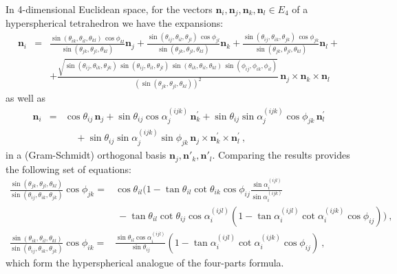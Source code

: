 \documentclass[fleqn,11pt,twoside]{article}
\theoremstyle{definition}
\begin{document}
In 4-dimensional Euclidean space, for the vectors  $\mathbf{n}_i,\mathbf{n}_j,\mathbf{n}_k,\mathbf{n}_l\in E_4$ of a hyperspherical tetrahedron we have the 
expansions: 
\begin{eqnarray} 
\mathbf{n}_i&=&
\frac{\sin(\theta_{ik},\theta_{il},\theta_{kl})\,\cos\phi_{kl}}
{\sin(\theta_{jk},\theta_{jl},\theta_{kl})}\mathbf{n}_j + 
\frac{\sin(\theta_{ij},\theta_{il},\theta_{jl})\,\cos\phi_{jl}}
{\sin(\theta_{jk},\theta_{jl},\theta_{kl})}\mathbf{n}_k + 
\frac{\sin(\theta_{ij},\theta_{ik},\theta_{jk})\,\cos\phi_{jk}}
{\sin(\theta_{jk},\theta_{jl},\theta_{kl})}\mathbf{n}_l +   \\ 
&& + \frac{\sqrt{
\sin(\theta_{ij},\theta_{ik},\theta_{jk})\,\sin(\theta_{ij},\theta_{il},\theta_{jl})\, 
\sin(\theta_{ik},\theta_{il},\theta_{kl})\,\sin(\phi_{ij},\phi_{ik},\phi_{il})}}
{\left(\sin(\theta_{jk},\theta_{jl},\theta_{kl})\right)^2}
\,\mathbf{n}_j\times\mathbf{n}_k\times\mathbf{n}_l\   
\end{eqnarray} 
as well as 
\begin{eqnarray}
\mathbf{n}_i&=&\cos\theta_{ij}\,\mathbf{n}_j + \sin\theta_{ij}\cos\alpha^{(ijk)}_j\, 
\mathbf{n}^\prime_k + \sin\theta_{ij}\sin\alpha^{(ijk)}_j\cos\phi_{jk}\,
\mathbf{n}_l^\prime   \\ 
&& ~~~~~ + \sin\theta_{ij}\sin\alpha^{(ijk)}_j\sin\phi_{jk}\,\mathbf{n}_j
\times\mathbf{n}^\prime_k\times\mathbf{n}^\prime_l\   , 
\end{eqnarray}  
in a (Gram-Schmidt) orthogonal basis $\mathbf{n}_j,\mathbf{n}'_k,\mathbf{n}'_l$. Comparing the results provides the following set of equations: 
\begin{equation} 
\begin{split}
\frac{\sin(\theta_{jk},\theta_{jl},\theta_{kl})}
{\sin(\theta_{ij},\theta_{ik},\theta_{jk})} \cos\phi_{jk} = 
&\cos\theta_{il} \Bigg( 1 - \tan\theta_{il}\cot\theta_{ik}\cos\phi_{ij} 
\frac{\sin\alpha_i^{(ijl)}}{\sin\alpha_i^{(ijk)}}   \\ 
&\ - \tan\theta_{il}\cot\theta_{ij}\cos\alpha_i^{(ijl)} 
\left( 1 - \tan\alpha_i^{(ijl)}\cot\alpha_i^{(ijk)}\cos\phi_{ij}\right) 
\Bigg)\   ,    \\  
\frac{\sin(\theta_{ik},\theta_{il},\theta_{kl})}
{\sin(\theta_{ij},\theta_{ik},\theta_{jk})} \cos\phi_{ik} =& 
\frac{\sin\theta_{il}\cos\alpha_i^{(ijl)}}{\sin\theta_{ij}} 
\left( 1 - \tan\alpha_i^{(ijl)}\cot\alpha_i^{(ijk)}\cos\phi_{ij}\right)\   ,  
\end{split}
\end{equation} 
which form the hyperspherical analogue of the four-parts formula. 
\end{document}

